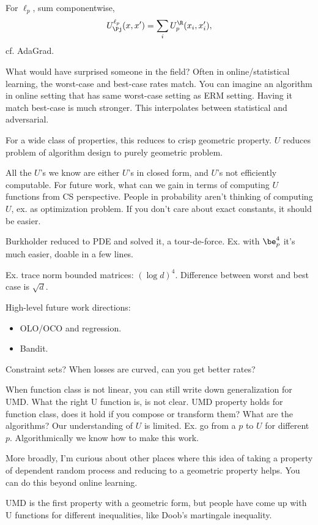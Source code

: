 For $\ell_p$, sum componentwise,
$$
U_{\Pj}^{\ell_p} (x,x') = \sum_i U_p^{\R} (x_i,x_i'),
$$
cf. AdaGrad.


What would have surprised someone in the field? Often in online/statistical learning, the worst-case and best-case rates match. You can imagine an algorithm in online setting that has same worst-case setting as ERM setting. Having it match best-case is much stronger. 
This interpolates between statistical and adversarial.

For a wide class of properties, this reduces to crisp geometric property.
$U$ reduces problem of algorithm design to purely geometric problem.

All the $U$'s we know are either $U$'s in closed form, and $U$'s not efficiently computable. For future work, what can we gain in terms of computing $U$ functions from CS perspective. People in probability aren't thinking of computing $U$, ex. as optimization problem. If you don't care about exact constants, it should be easier. %

Burkholder reduced to PDE and solved it, a tour-de-force. Ex. with $\be_p^4$ it's much easier, doable in a few lines. %

Ex. trace norm bounded matrices: $(\log d)^4$. Difference between worst and best case is $\sqrt d$.

High-level future work directions: 
\begin{itemize}
\item
OLO/OCO and regression.
\item
Bandit.
\end{itemize}
Constraint sets? When losses are curved, can you get better rates?

When function class is not linear, you can still write down generalization for UMD. What the right U function is, is not clear. UMD property holds for function class, does it hold if you compose or transform them? What are the algorithms? Our understanding of $U$ is limited. Ex. go from a $p$ to $U$ for different $p$. Algorithmically we know how to make this work.

More broadly, I'm curious about other places where this idea of taking a property of dependent random process and reducing to a geometric property helps. You can do this beyond online learning. 

UMD is the first property with a geometric form, but people have come up with U functions for different inequalities, like Doob's martingale inequality.


\printbibliography
